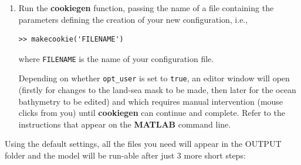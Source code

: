 \begin{enumerate}
\vspace{2mm}
\item Run the \textbf{cookiegen} function, passing the name of a file containing the parameters defining the creation of your new configuration, i.e.,
\vspace{0mm}\small\begin{verbatim}
>> makecookie('FILENAME')
\end{verbatim}\normalsize\vspace{0mm}
where \texttt{\small FILENAME} is the name of your configuration file.

\vspace{2mm}
Depending on whether \texttt{\small opt\_user} is set to \texttt{\small true}, an editor window will open (firstly for changes to the land-sea mask to be made, then later for the ocean bathymetry to be edited) and which requires manual intervention (mouse clicks from you) until \textbf{cookiegen} can continue and complete. Refer to the instructions that appear on the \textbf{MATLAB} command line.

\end{enumerate}

\vspace{2mm}
\noindent Using the default settings, all the files you need will appear in the \textsf{\footnotesize OUTPUT} folder and the model will be run-able after just 3 more short steps:

